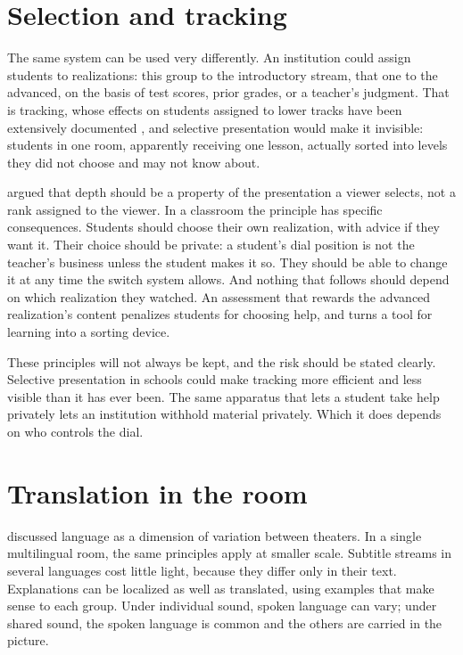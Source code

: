 \section{Selection and tracking}

The same system can be used very differently. An institution could assign students to realizations: this group to the introductory stream, that one to the advanced, on the basis of test scores, prior grades, or a teacher's judgment. That is tracking, whose effects on students assigned to lower tracks have been extensively documented \cite{oakes}, and selective presentation would make it invisible: students in one room, apparently receiving one lesson, actually sorted into levels they did not choose and may not know about.

 argued that depth should be a property of the presentation a viewer selects, not a rank assigned to the viewer. In a classroom the principle has specific consequences. Students should choose their own realization, with advice if they want it. Their choice should be private: a student's dial position is not the teacher's business unless the student makes it so. They should be able to change it at any time the switch system allows. And nothing that follows should depend on which realization they watched. An assessment that rewards the advanced realization's content penalizes students for choosing help, and turns a tool for learning into a sorting device.

These principles will not always be kept, and the risk should be stated clearly. Selective presentation in schools could make tracking more efficient and less visible than it has ever been. The same apparatus that lets a student take help privately lets an institution withhold material privately. Which it does depends on who controls the dial.

\section{Translation in the room}

 discussed language as a dimension of variation between theaters. In a single multilingual room, the same principles apply at smaller scale. Subtitle streams in several languages cost little light, because they differ only in their text. Explanations can be localized as well as translated, using examples that make sense to each group. Under individual sound, spoken language can vary; under shared sound, the spoken language is common and the others are carried in the picture.

